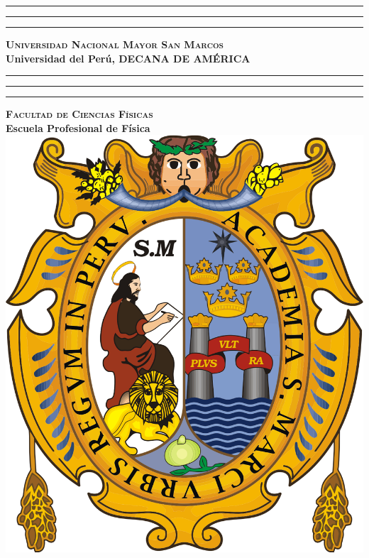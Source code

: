 \begin{titlepage}
	\centering
	\vspace{-20pt}
    \hrule {\color{purple} \rule{\linewidth}{0.5mm}} \hrule 
	\vspace{0.8cm}
	\textsc{\Large \textbf{Universidad Nacional Mayor San Marcos}\\}
	\vspace{0.5cm}
	\textbf{\normalsize Universidad del Perú, DECANA DE AMÉRICA\\}
    \vspace*{0.8cm}
    \hrule  {\color{purple} \rule{\linewidth}{0.5mm}} \hrule
	\vspace{1.2cm}
	\textsc{\Large \bfseries Facultad de Ciencias Físicas \\}
    \vspace{0.4cm}
	\textbf{\large \bfseries Escuela Profesional de Física \\}
    \vspace*{1.0 cm}
    \includegraphics[scale = 0.10]{Portada/logoUNMSM.png}\\[1.0 cm]	%

\end{titlepage}

